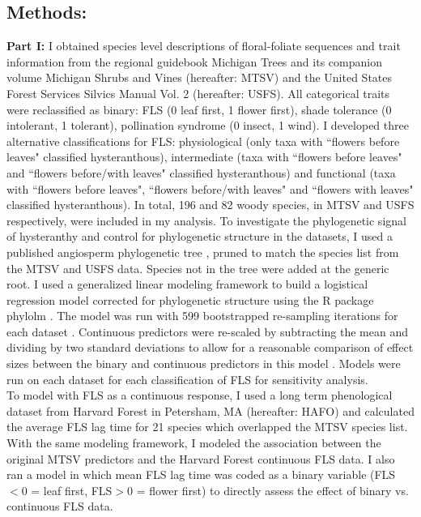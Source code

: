 \documentclass[12pt]{article}\usepackage[]{graphicx}\usepackage[]{color}
\begin{document}
\subsection*{Methods:}
\indent\indent\textbf{Part I:} I obtained species level descriptions of floral-foliate sequences and trait information from the regional guidebook Michigan Trees \citep{Barnes2004} and its companion volume Michigan Shrubs and Vines \citep{Barnes2016} (hereafter: MTSV) and the United States Forest Services Silvics Manual Vol. 2 \citep{Burns1990} (hereafter: USFS). All categorical traits were reclassified as binary: FLS (0 leaf first, 1 flower first), shade tolerance (0 intolerant, 1 tolerant), pollination syndrome (0 insect, 1 wind). I developed three alternative classifications for FLS: physiological (only taxa with ``flowers before leaves" classified hysteranthous), intermediate (taxa with ``flowers before leaves" and ``flowers before/with leaves" classified hysteranthous) and functional (taxa with ``flowers before leaves", ``flowers before/with leaves" and ``flowers with leaves" classified hysteranthous). In total, 196 and 82 woody species, in MTSV and USFS respectively, were included in my analysis. To investigate the phylogenetic signal of hysteranthy and control for phylogenetic structure in the datasets, I used a published angiosperm phylogenetic tree \citep{Zanne2013}, pruned to match the species list from the MTSV and USFS data. Species not in the tree were added at the generic root. I used  a generalized linear modeling framework \citep{Ives2010} to build a logistical regression model corrected for phylogenetic structure using the R package phylolm \citep{Ho2014}. The model was run with 599 bootstrapped re-sampling iterations for each dataset \citep{Wilcox2010}. Continuous predictors were re-scaled by subtracting the mean and dividing by two standard deviations to allow for a reasonable comparison of effect sizes between the binary and continuous predictors in this model \citep{Gelman2007}. Models were run on each dataset for each classification of FLS for sensitivity analysis.\\ 
\indent To model with FLS as a continuous response, I used a long term phenological dataset from Harvard Forest in Petersham, MA \citep{Okeefe2015} (hereafter: HAFO)  and calculated the average FLS lag time for 21 species which overlapped the MTSV species list. With the same modeling framework, I modeled the association between the original MTSV predictors and the Harvard Forest continuous FLS data. I also ran a model in which mean FLS lag time was coded as a binary variable (FLS$<0$ = leaf first, FLS$>0$ = flower first) to directly assess the effect of binary vs. continuous FLS data.\\
\end{document}
